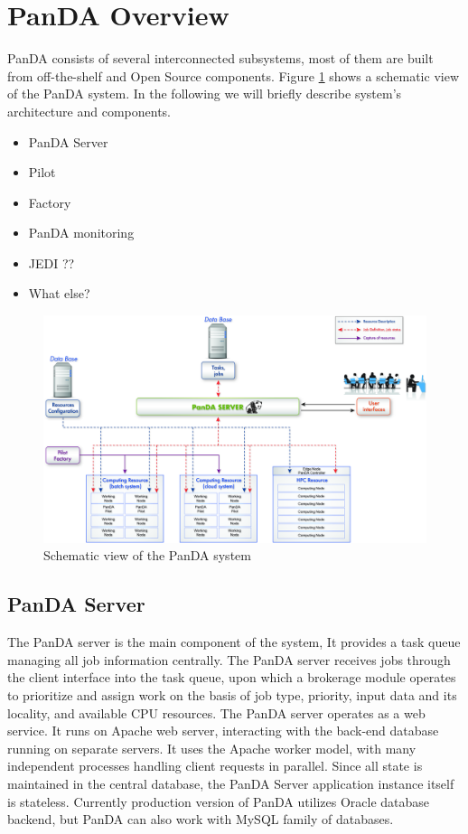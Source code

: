\documentclass[10pt, conference, compsocconf]{IEEEtran}
\begin{document}
\section{PanDA Overview}\label{sec:panda_overview}
PanDA consists of several interconnected subsystems, most of them are built from off-the-shelf and Open Source components. Figure \ref{fig:architecture} shows a schematic view of the PanDA system.
In the following we will briefly describe system’s architecture and components.

\begin{itemize}
\item PanDA Server
\item Pilot
\item Factory
\item PanDA monitoring
\item JEDI ??
\item What else?
\end{itemize}


\begin{figure}
\begin{center}
\includegraphics[width=\columnwidth]{figures/PandaArch.jpg}
\caption{Schematic view of the PanDA system\label{fig:architecture}}
\end{center}
\end{figure}
\subsection{PanDA Server}
The PanDA server is the main component of the system, It provides  a task queue managing all job information centrally. The PanDA  server receives jobs through the client interface into the task queue, upon which a brokerage module  operates to prioritize  and assign work on the basis of job type, priority, input data and its locality, and available CPU resources. The PanDA  server operates as a web service. It runs on Apache web server, interacting with the back-end database running  on separate servers. It uses the Apache worker  model, with many independent   processes  handling client requests  in  parallel. Since all  state is maintained  in  the central database,  the PanDA Server application instance itself is stateless. Currently production version of PanDA utilizes Oracle database backend, but PanDA  can also work with MySQL family of databases.
\end{document}
